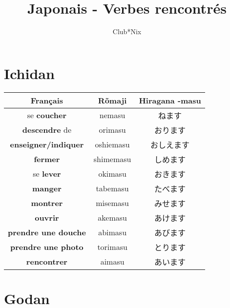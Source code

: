 \documentclass[11pt]{report}
\title{Japonais - Verbes rencontrés}
\author{
	Club*Nix
}
\newenvironment{Japanese}{%
\CJKfamily{min}%
\CJKtilde  
\CJKnospace}{}
\begin{document}
\maketitle
\tableofcontents

\chapter{Ichidan}

\begin{CJK}{UTF8}{}  
\begin{Japanese}
	\begin{center}
		\begin{tabular}{|c|c|c|}
				\hline
				\textbf{Français} & \textbf{Rõmaji} & \textbf{Hiragana -masu} \\
				\hline
				se \textbf{coucher} & nemasu & ねます \\	
				\hline 
				\textbf{descendre} de & orimasu & おります \\
				\hline
				\textbf{enseigner/indiquer} & oshiemasu & おしえます \\
				\hline
				\textbf{fermer} & shimemasu & しめます \\
				\hline
				se \textbf{lever} & okimasu & おきます \\
				\hline
				\textbf{manger} & tabemasu & たべます \\
				\hline
				\textbf{montrer} & misemasu & みせます \\
				\hline
				\textbf{ouvrir} & akemasu & あけます \\
				\hline
				\textbf{prendre une douche} & abimasu & あびます \\
				\hline
				\textbf{prendre une photo} & torimasu & とります \\
				\hline
				\textbf{rencontrer} & aimasu & あいます \\
				\hline
			\end{tabular}
	\end{center}
\end{Japanese}  
\end{CJK}

\chapter{Godan}
\end{document}

